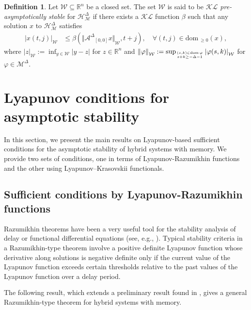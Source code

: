 \documentclass[journal,final,twocolumn]{IEEEtran}
\theoremstyle{definition}
\newtheorem{defn}{Definition}
\begin{document}
\begin{defn}\label{def:stability}
Let ${\mathcal{W}}{\subseteq}{\mathbb R}^n$ be a closed set. The set ${\mathcal{W}}$ is said to be \emph{${\mathcal{KL}}$ pre-asymptotically stable} for ${\mathcal{H}_{\mathcal{M}}^{\Delta}}$ if there exists a ${\mathcal{KL}}$ function $\beta$ such that any solution $x$ to ${\mathcal{H}_{\mathcal{M}}^{\Delta}}$ satisfies
\begin{align*}
{\left\vert{x(t,j)}\right\vert}_{\mathcal{W}}&\le \beta({\Vert{{\mathcal{A}^{\Delta}}_{[0,0]}x}\Vert}_{\mathcal{W}},t+j),\quad\forall (t,j)\in{\text{dom}\,}_{\ge 0}(x),
\end{align*}
where ${\left\vert{z}\right\vert}_{\mathcal{W}}:=\inf_{y\in{\mathcal{W}}}{\left\vert{y-z}\right\vert}$ for $z\in{\mathbb R}^n$ and
${\Vert{\varphi}\Vert}_{\mathcal{W}}:=\sup_{(s,k)\in{\text{dom}\,}{\varphi}\atop s+k\ge -\Delta-1}{\left\vert{{\varphi}(s,k)}\right\vert}_{\mathcal{W}}$
for ${\varphi}\in{\mathcal{M}^{\Delta}}$.
\end{defn}

\section{Lyapunov conditions for asymptotic stability}\label{sec:stability}

In this section, we present the main results on Lyapunov-based sufficient conditions for the asymptotic stability of hybrid systems with memory. We provide two sets of conditions, one in terms of Lyapunov-Razumikhin functions and the other using Lyapunov--Krasovskii functionals.

\subsection{Sufficient conditions by Lyapunov-Razumikhin functions}

Razumikhin theorems \cite{razumikhin1956stability} have been a very useful tool for the stability analysis of delay or functional differential equations (see, e.g., \cite[Theorem 4.2, Chapter 5]{hale1993introduction}). Typical stability criteria in a Razumikhin-type theorem involve a positive definite Lyapunov function whose derivative along solutions is negative definite only if the current value of the Lyapunov function exceeds certain thresholds relative to the past values of the Lyapunov function over a delay period. 

The following result, which extends a preliminary result found in \cite{liu2014hybrid-ifac}, gives a general Razumikhin-type theorem for hybrid systems with memory.
\end{document}
